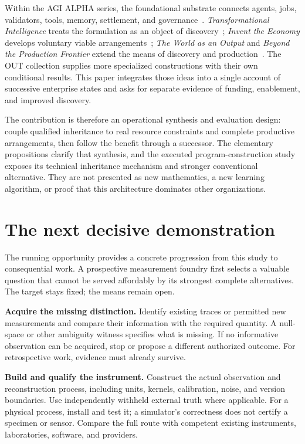\documentclass[10pt,a4paper]{article}
\begin{document}
Within the AGI ALPHA series, the foundational substrate connects agents, jobs, validators, tools, memory, settlement, and governance~\citep{foundation}. \emph{Transformational Intelligence} treats the formulation as an object of discovery~\citep{ti}; \emph{Invent the Economy} develops voluntary viable arrangements~\citep{economy}; \emph{The World as an Output} and \emph{Beyond the Production Frontier} extend the means of discovery and production~\citep{world,frontier}. The OUT collection supplies more specialized constructions with their own conditional results. This paper integrates those ideas into a single account of successive enterprise states and asks for separate evidence of funding, enablement, and improved discovery.

The contribution is therefore an operational synthesis and evaluation design: couple qualified inheritance to real resource constraints and complete productive arrangements, then follow the benefit through a successor. The elementary propositions clarify that synthesis, and the executed program-construction study exposes its technical inheritance mechanism and stronger conventional alternative. They are not presented as new mathematics, a new learning algorithm, or proof that this architecture dominates other organizations.


\section{The next decisive demonstration}\label{sec:frontier}

The running opportunity provides a concrete progression from this study to consequential work. A prospective measurement foundry first selects a valuable question that cannot be served affordably by its strongest complete alternatives. The target stays fixed; the means remain open.

\textbf{Acquire the missing distinction.} Identify existing traces or permitted new measurements and compare their information with the required quantity. A null-space or other ambiguity witness specifies what is missing. If no informative observation can be acquired, stop or propose a different authorized outcome. For retrospective work, evidence must already survive.

\textbf{Build and qualify the instrument.} Construct the actual observation and reconstruction process, including units, kernels, calibration, noise, and version boundaries. Use independently withheld external truth where applicable. For a physical process, install and test it; a simulator's correctness does not certify a specimen or sensor. Compare the full route with competent existing instruments, laboratories, software, and providers.
\end{document}
